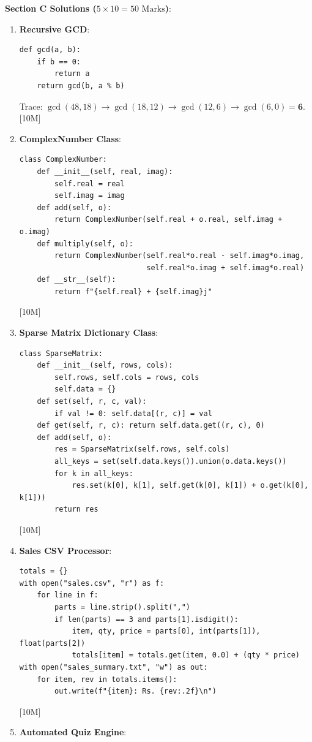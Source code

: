 \begin{solutionbox}
\medskip
\noindent\textbf{Section C Solutions ($5 \times 10 = 50\text{ Marks}$)}:
\begin{enumerate}[start=17]
    \item \textbf{Recursive GCD}:
    \begin{lstlisting}[language=Python3]
def gcd(a, b):
    if b == 0:
        return a
    return gcd(b, a % b)
    \end{lstlisting}
    Trace: $\gcd(48, 18) \to \gcd(18, 12) \to \gcd(12, 6) \to \gcd(6, 0) = \mathbf{6}$. [10M]
    \item \textbf{ComplexNumber Class}:
    \begin{lstlisting}[language=Python3]
class ComplexNumber:
    def __init__(self, real, imag):
        self.real = real
        self.imag = imag
    def add(self, o):
        return ComplexNumber(self.real + o.real, self.imag + o.imag)
    def multiply(self, o):
        return ComplexNumber(self.real*o.real - self.imag*o.imag,
                             self.real*o.imag + self.imag*o.real)
    def __str__(self):
        return f"{self.real} + {self.imag}j"
    \end{lstlisting} [10M]
    \item \textbf{Sparse Matrix Dictionary Class}:
    \begin{lstlisting}[language=Python3]
class SparseMatrix:
    def __init__(self, rows, cols):
        self.rows, self.cols = rows, cols
        self.data = {}
    def set(self, r, c, val):
        if val != 0: self.data[(r, c)] = val
    def get(self, r, c): return self.data.get((r, c), 0)
    def add(self, o):
        res = SparseMatrix(self.rows, self.cols)
        all_keys = set(self.data.keys()).union(o.data.keys())
        for k in all_keys:
            res.set(k[0], k[1], self.get(k[0], k[1]) + o.get(k[0], k[1]))
        return res
    \end{lstlisting} [10M]
    \item \textbf{Sales CSV Processor}:
    \begin{lstlisting}[language=Python3]
totals = {}
with open("sales.csv", "r") as f:
    for line in f:
        parts = line.strip().split(",")
        if len(parts) == 3 and parts[1].isdigit():
            item, qty, price = parts[0], int(parts[1]), float(parts[2])
            totals[item] = totals.get(item, 0.0) + (qty * price)
with open("sales_summary.txt", "w") as out:
    for item, rev in totals.items():
        out.write(f"{item}: Rs. {rev:.2f}\n")
    \end{lstlisting} [10M]
    \item \textbf{Automated Quiz Engine}:

\end{enumerate}
\end{solutionbox}
